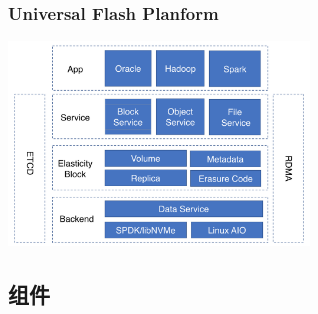 \documentclass[UTF8,8pt,xcolor=dvipsnames]{beamer}
\begin{document}
\begin{frame}[fragile]
    \frametitle{Universal Flash Planform}
    \begin{center}
        \includegraphics[width=0.6\textwidth]{../imgs/universal-flash.png}
    \end{center}
\end{frame}

\subsection{组件}
\end{document}
